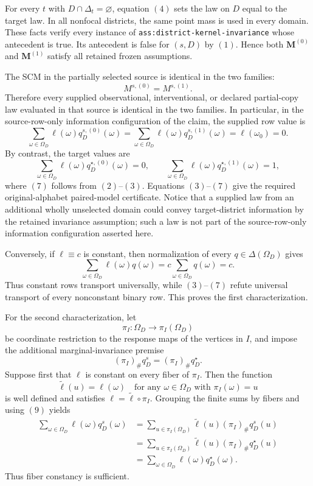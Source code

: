 For every \(t\) with \(D\cap\Delta_t=\varnothing\), equation \((4)\)
sets the law on \(D\) equal to the target law.  In all nonfocal districts,
the same point mass is used in every domain.  These facts verify every
instance of \texttt{ass:district-kernel-invariance} whose antecedent is
true.  Its antecedent is false for \((s,D)\) by \((1)\).  Hence both
\(\mathbf M^{(0)}\) and \(\mathbf M^{(1)}\) satisfy all retained frozen
assumptions.

The SCM in the partially selected source is identical in the two families:
\[
M^{s,(0)}=M^{s,(1)}.
\tag{5}
\]
Therefore every supplied observational, interventional, or declared
partial-copy law evaluated in that source is identical in the two
families.  In particular, in the source-row-only information configuration
of the claim, the supplied row value is
\[
\sum_{\omega\in\Omega_D}\ell(\omega)q_D^{s,(0)}(\omega)
=
\sum_{\omega\in\Omega_D}\ell(\omega)q_D^{s,(1)}(\omega)
=\ell(\omega_0)=0.
\tag{6}
\]
By contrast, the target values are
\[
\sum_{\omega\in\Omega_D}\ell(\omega)q_D^{\star,(0)}(\omega)=0,
\qquad
\sum_{\omega\in\Omega_D}\ell(\omega)q_D^{\star,(1)}(\omega)=1,
\tag{7}
\]
where \((7)\) follows from \((2)\)--\((3)\).  Equations
\((3)\)--\((7)\) give the required original-alphabet paired-model
certificate.  Notice that a supplied law from an additional wholly
unselected domain could convey target-district information by the retained
invariance assumption; such a law is not part of the source-row-only
information configuration asserted here.

Conversely, if \(\ell\equiv c\) is constant, then normalization of every
\(q\in\Delta(\Omega_D)\) gives
\[
\sum_{\omega\in\Omega_D}\ell(\omega)q(\omega)
=c\sum_{\omega\in\Omega_D}q(\omega)=c.
\tag{8}
\]
Thus constant rows transport universally, while \((3)\)--\((7)\) refute
universal transport of every nonconstant binary row.  This proves the first
characterization.

For the second characterization, let
\[
\pi_I:\Omega_D\longrightarrow\pi_I(\Omega_D)
\]
be coordinate restriction to the response maps of the vertices in \(I\),
and impose the additional marginal-invariance premise
\[
(\pi_I)_\#q_D^s=(\pi_I)_\#q_D^\star.
\tag{9}
\]
Suppose first that \(\ell\) is constant on every fiber of \(\pi_I\).
Then the function
\[
\widetilde\ell(u)=\ell(\omega)
\quad\text{for any }\omega\in\Omega_D\text{ with }\pi_I(\omega)=u
\]
is well defined and satisfies \(\ell=\widetilde\ell\circ\pi_I\).  Grouping
the finite sums by fibers and using \((9)\) yields
\[
\begin{aligned}
\sum_{\omega\in\Omega_D}\ell(\omega)q_D^s(\omega)
&=\sum_{u\in\pi_I(\Omega_D)}
  \widetilde\ell(u)(\pi_I)_\#q_D^s(u)\\
&=\sum_{u\in\pi_I(\Omega_D)}
  \widetilde\ell(u)(\pi_I)_\#q_D^\star(u)\\
&=\sum_{\omega\in\Omega_D}\ell(\omega)q_D^\star(\omega).
\end{aligned}
\tag{10}
\]
Thus fiber constancy is sufficient.


